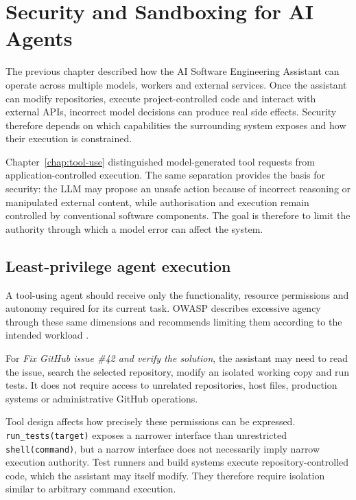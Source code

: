 \chapter{Security and Sandboxing for AI Agents}
\label{chap:security}

The previous chapter described how the AI Software Engineering Assistant can operate across multiple models, workers and external services. Once the assistant can modify repositories, execute project-controlled code and interact with external APIs, incorrect model decisions can produce real side effects. Security therefore depends on which capabilities the surrounding system exposes and how their execution is constrained.

Chapter~\ref{chap:tool-use} distinguished model-generated tool requests from application-controlled execution. The same separation provides the basis for security: the LLM may propose an unsafe action because of incorrect reasoning or manipulated external content, while authorisation and execution remain controlled by conventional software components. The goal is therefore to limit the authority through which a model error can affect the system.

\section{Least-privilege agent execution}

A tool-using agent should receive only the functionality, resource permissions and autonomy required for its current task. OWASP describes excessive agency through these same dimensions and recommends limiting them according to the intended workload \parencite{owasp2025agency}.

For \emph{Fix GitHub issue \#42 and verify the solution}, the assistant may need to read the issue, search the selected repository, modify an isolated working copy and run tests. It does not require access to unrelated repositories, host files, production systems or administrative GitHub operations.

Tool design affects how precisely these permissions can be expressed. \texttt{run\_tests(target)} exposes a narrower interface than unrestricted \texttt{shell(command)}, but a narrow interface does not necessarily imply narrow execution authority. Test runners and build systems execute repository-controlled code, which the assistant may itself modify. They therefore require isolation similar to arbitrary command execution.

